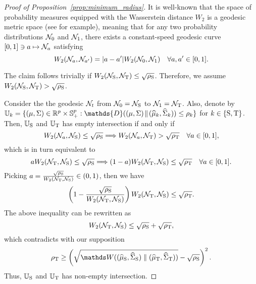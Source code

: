 \documentclass{article}
\begin{document}
\begin{proof}[Proof of Proposition~\ref{prop:minimum_radius}]
It is well-known that the space of probability measures equipped with the Wasserstein distance $W_2 $ is a geodesic metric space (see \citet[Section 7]{ref:villani2008optimal} for example), meaning that for any two probability distributions $\mathcal N_0$ and $\mathcal N_1$, there exists a constant-speed geodesic curve $[0,1] \ni a\mapsto \mathcal N_a$ satisfying 
\[ W_2 ( \mathcal N_a, \mathcal N_{a'} ) = |a - a'| W_2 ( \mathcal N_0, \mathcal N_1 ) \quad\forall a,a'\in [0,1].\]

The claim follows trivially if $W_2 ( \mathcal N_{\rm S}, \mathcal N_{\rm T} ) \le \sqrt{\rho_{\rm S}}$. Therefore, we assume $W_2 ( \mathcal N_{\rm S}, \mathcal N_{\rm T} ) >\sqrt{\rho_{\rm S}}$.

Consider the the geodesic $\mathcal N_t$ from $\mathcal N_0 = \mathcal N_{\rm S}$ to $\mathcal N_1 = \mathcal N_{\rm T}$. Also, denote by $\mbb U_k =  \{ (\m, \cov)\in \R^p\times \PSD^p:  \mathds{D}( (\m, \cov)\! \parallel\! (\msa_k, \covsa_k) )\le \rho_k \}$ for $k\in \{\rm S, \rm T\} $. Then, $\mathbb U_{\rm S}$ and $\mathbb U_{\rm T} $ has empty intersection if and only if 
\[ W_2 ( \mathcal N_a , \mathcal N_{\rm S} ) \le \sqrt{\rho_{\rm S}} \Longrightarrow W_2 ( \mathcal N_a , \mathcal N_{\rm T} ) > \sqrt{\rho_{\rm T}} \quad\forall a\in [0,1],\]
which is in turn equivalent to 
\[ a W_2 ( \mathcal N_{\rm T} , \mathcal N_{\rm S} ) \le \sqrt{\rho_{\rm S}} \Longrightarrow (1-a) W_2 ( \mathcal N_{\rm T} , \mathcal N_{\rm S} ) \le \sqrt{\rho_{\rm T}} \quad \forall a\in[0,1].\]
Picking $a = \frac{\sqrt{\rho_{\rm S}}}{W_2 ( \mathcal N_{\rm T} , \mathcal N_{\rm S} )} \in (0,1)$, then we have
\begin{align*}
    \left( 1 - \frac{\sqrt{\rho_{\rm S}}}{W_2 ( \mathcal N_{\rm T} , \mathcal N_{\rm S} )} \right) W_2 ( \mathcal N_{\rm T} , \mathcal N_{\rm S} ) \le \sqrt{\rho_{\rm T}}.
\end{align*}
The above inequality can be rewritten as
\[ W_2 ( \mathcal N_{\rm T} , \mathcal N_{\rm S} ) \le \sqrt{\rho_{\rm S}} + \sqrt{\rho_{\rm T}}, \]
which contradicts with our supposition
\[\rho_{\rm T}\geq \left(\sqrt{\mathds  W((\msa_{\rm S}, \covsa_{\rm S}) \parallel (\msa_{\rm T}, \covsa_{\rm T}))} - \sqrt{\rho_{\rm S}}\right)^{2}.\]
Thus, $\mathbb U_{\rm S}$ and $\mathbb U_{\rm T}$ has non-empty intersection.
\end{proof}
\end{document}
